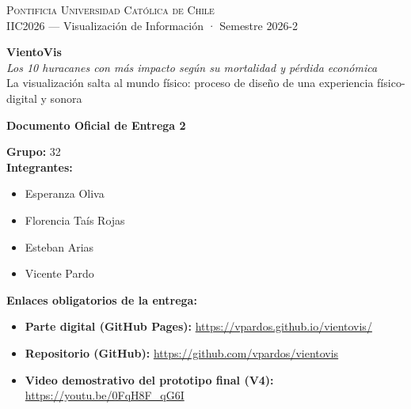 \documentclass[11pt,a4paper]{article}
\begin{document}
	\begin{center}
		{\scshape\Large Pontificia Universidad Católica de Chile}\\[0.2cm]
		{\large IIC2026 — Visualización de Información · Semestre 2026-2}\\[0.8cm]

		\begin{tcolorbox}[colback=ink, colframe=ink, arc=6pt, halign=center, left=15pt, right=15pt, top=14pt, bottom=14pt]
			{\color{white}\Huge \textbf{VientoVis}}\\[0.25cm]
			{\color{ochre}\LARGE \textit{Los 10 huracanes con más impacto según su mortalidad y pérdida económica}}\\[0.2cm]
			{\color{softgray}\large La visualización salta al mundo físico: proceso de diseño de una experiencia físico-digital y sonora}
		\end{tcolorbox}
		\vspace{0.4cm}

		{\large \textbf{Documento Oficial de Entrega 2}}\\[0.4cm]

		\begin{metabox}
			\textbf{Grupo:} 32\\[0.15cm]
			\textbf{Integrantes:}
			\begin{itemize}[leftmargin=1.2em]
				\item Esperanza Oliva
				\item Florencia Taís Rojas
				\item Esteban Arias
				\item Vicente Pardo
			\end{itemize}
			\vspace{0.25cm}
			\textbf{Enlaces obligatorios de la entrega:}
			\begin{itemize}[leftmargin=1.2em]
				\item \textbf{Parte digital (GitHub Pages):} \href{https://vpardos.github.io/vientovis/}{https://vpardos.github.io/vientovis/}
				\item \textbf{Repositorio (GitHub):} \href{https://github.com/vpardos/vientovis}{https://github.com/vpardos/vientovis}
				\item \textbf{Video demostrativo del prototipo final (V4):} \href{https://youtu.be/0FqH8F_qG6I}{https://youtu.be/0FqH8F\_qG6I}
			\end{itemize}
		\end{metabox}
	\end{center}
\end{document}
